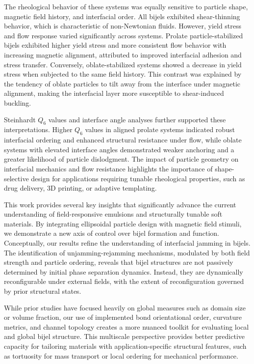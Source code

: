 The rheological behavior of these systems was equally sensitive to particle shape, magnetic field history, and interfacial order. All 
bijels exhibited shear-thinning behavior, which is characteristic of non-Newtonian fluids. However, yield stress and flow 
response varied significantly across systems. Prolate particle-stabilized bijels exhibited higher yield stress and more consistent flow 
behavior with increasing magnetic alignment, attributed to improved interfacial adhesion and stress transfer. Conversely, oblate-stabilized 
systems showed a decrease in yield stress when subjected to the same field history. This contrast was explained by the tendency of oblate 
particles to tilt away from the interface under magnetic alignment, making the interfacial layer more susceptible to shear-induced buckling.

Steinhardt $Q_6$ values and interface angle analyses further supported these interpretations. Higher $Q_6$ values in aligned prolate systems 
indicated robust interfacial ordering and enhanced structural resistance under flow, while oblate systems with elevated interface angles 
demonstrated weaker anchoring and a greater likelihood of particle dislodgment. The impact of particle geometry on interfacial mechanics 
and flow resistance highlights the importance of shape-selective design for applications requiring tunable rheological properties, such as 
drug delivery, 3D printing, or adaptive templating.

This work provides several key insights that significantly advance the current understanding of field-responsive emulsions and structurally 
tunable soft materials. By integrating ellipsoidal particle design with magnetic field stimuli, we demonstrate a new axis of control over 
bijel formation and function. Conceptually, our results refine the understanding of interfacial jamming in bijels. The identification of
unjamming-rejamming mechanisms, modulated by both field strength and particle ordering, reveals that bijel structures are not passively 
determined by initial phase separation dynamics. Instead, they are dynamically reconfigurable under external fields, with the extent of 
reconfiguration governed by prior structural states.

While prior studies have focused heavily on global measures such as domain size or volume fraction, our use of implemented bond orientational order, 
curvature metrics, and channel topology creates a more nuanced toolkit for evaluating local and global bijel structure. This multiscale 
perspective provides better predictive capacity for tailoring materials with application-specific structural features, such as tortuosity 
for mass transport or local ordering for mechanical performance.

